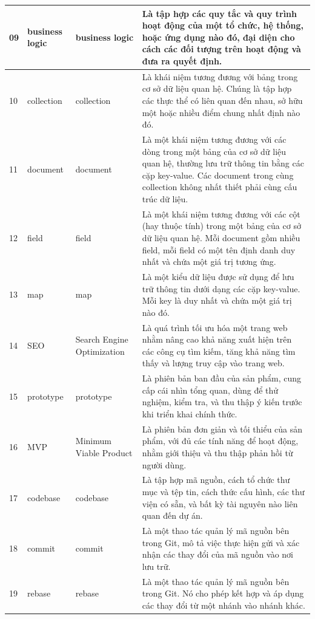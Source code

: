 \begin{center}
\begin{longtable}{|p{1cm}|p{2.75cm}|p{2.75cm}|p{8cm}|}
        \hline
        09 & business logic & business logic & Là tập hợp các quy tắc và quy trình hoạt động của một tổ chức, hệ thống, hoặc ứng dụng nào đó, đại diện cho cách các đối tượng trên hoạt động và đưa ra quyết định. \\ 
        \hline
        10 & collection & collection & Là khái niệm tương đương với bảng trong cơ sở dữ liệu quan hệ. Chúng là tập hợp các thực thể có liên quan đến nhau, sở hữu một hoặc nhiều điểm chung nhất định nào đó. \\ 
        \hline
        11 & document & document & Là một khái niệm tương đương với các dòng trong một bảng của cơ sở dữ liệu quan hệ, thường lưu trữ thông tin bằng các cặp key-value. Các document trong cùng collection không nhất thiết phải cùng cấu trúc dữ liệu. \\ 
        \hline
        12 & field & field & Là một khái niệm tương đương với các cột (hay thuộc tính) trong một bảng của cơ sở dữ liệu quan hệ. Mỗi document gồm nhiều field, mỗi field có một tên định danh duy nhất và chứa một giá trị tương ứng. \\ 
        \hline
        13 & map & map & Là một kiểu dữ liệu được sử dụng để lưu trữ thông tin dưới dạng các cặp key-value. Mỗi key là duy nhất và chứa một giá trị nào đó. \\ 
        \hline
        14 & SEO & Search Engine Optimization & Là quá trình tối ưu hóa một trang web nhằm nâng cao khả năng xuất hiện trên các công cụ tìm kiếm, tăng khả năng tìm thấy và lượng truy cập vào trang web. \\ 
        \hline
        15 & prototype & prototype & Là phiên bản ban đầu của sản phẩm, cung cấp cái nhìn tổng quan, dùng để thử nghiệm, kiểm tra, và thu thập ý kiến trước khi triển khai chính thức. \\ 
        \hline
        16 & MVP & Minimum Viable Product & Là phiên bản đơn giản và tối thiểu của sản phẩm, với đủ các tính năng để hoạt động, nhằm giới thiệu và thu thập phản hồi từ người dùng. \\ 
        \hline
        17 & codebase & codebase & Là tập hợp mã nguồn, cách tổ chức thư mục và tệp tin, cách thức cấu hình, các thư viện có sẵn, và bất kỳ tài nguyên nào liên quan đến dự án. \\ 
        \hline
        18 & commit & commit & Là một thao tác quản lý mã nguồn bên trong Git, mô tả việc thực hiện gửi và xác nhận các thay đổi của mã nguồn vào nơi lưu trữ. \\ 
        \hline
        19 & rebase & rebase & Là một thao tác quản lý mã nguồn bên trong Git. Nó cho phép kết hợp và áp dụng các thay đổi từ một nhánh vào nhánh khác. \\ 

\end{longtable}
\end{center}
